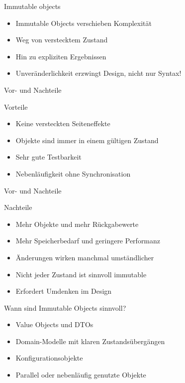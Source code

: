 \begin{frame}{Immutable objects}
	\begin{itemize}
	  \item Immutable Objects verschieben Komplexität
	  \item Weg von verstecktem Zustand
	  \item Hin zu expliziten Ergebnissen
	  \item Unveränderlichkeit erzwingt Design, nicht nur Syntax!
	\end{itemize}	
\end{frame}

\begin{frame}{Vor- und Nachteile}
	\begin{exampleblock}{Vorteile}
		\begin{itemize}
		  \item Keine versteckten Seiteneffekte
		  \item Objekte sind immer in einem gültigen Zustand
		  \item Sehr gute Testbarkeit
		  \item Nebenläufigkeit ohne Synchronisation
		\end{itemize}	
	\end{exampleblock}
\end{frame}

\begin{frame}{Vor- und Nachteile}
	\begin{exampleblock}{Nachteile}
		\begin{itemize}
		  \item Mehr Objekte und mehr Rückgabewerte
		  \item Mehr Speicherbedarf und geringere Performanz
		  \item Änderungen wirken manchmal umständlicher
		  \item Nicht jeder Zustand ist sinnvoll immutable
		  \item Erfordert Umdenken im Design
		\end{itemize}
	\end{exampleblock}
\end{frame}

\begin{frame}{Wann sind Immutable Objects sinnvoll?}
	\begin{itemize}
	  \item Value Objects und DTOs
	  \item Domain-Modelle mit klaren Zustandsübergängen
	  \item Konfigurationsobjekte
	  \item Parallel oder nebenläufig genutzte Objekte
	\end{itemize}
\end{frame}

